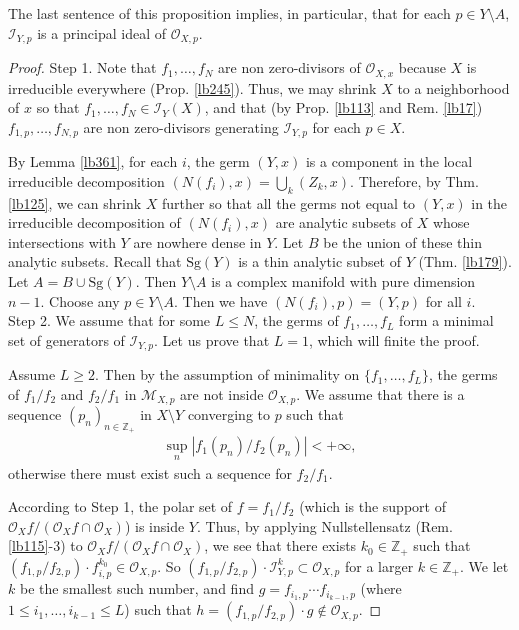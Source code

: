 \documentclass[12pt,b5paper,notitlepage]{report}
\theoremstyle{definition}
\theoremstyle{plain}
\newcommand{\scr}{\mathscr}
\newcommand{\Zbb}{\mathbb Z}
\newcommand{\Sg}{\mathrm{Sg}}
\numberwithin{equation}{section}
\begin{document}
The last sentence of this proposition implies, in particular, that for each $p\in Y\setminus A$, $\scr I_{Y,p}$ is a principal ideal of $\scr O_{X,p}$.


\begin{proof}
Step 1. Note that $f_1,\dots,f_N$ are non zero-divisors of $\scr O_{X,x}$ because $X$ is irreducible everywhere (Prop. \ref{lb245}). Thus, we may shrink $X$ to a neighborhood of $x$ so that $f_1,\dots,f_N\in\scr I_Y(X)$, and that (by Prop. \ref{lb113} and Rem. \ref{lb17}) $f_{1,p},\dots,f_{N,p}$ are non zero-divisors generating $\scr I_{Y,p}$ for each $p\in X$.

By Lemma \ref{lb361}, for each $i$, the germ $(Y,x)$ is a component in the local irreducible decomposition $(N(f_i),x)=\bigcup_k (Z_k,x)$. Therefore, by Thm. \ref{lb125}, we can shrink $X$ further so that all the germs not equal to $(Y,x)$ in the irreducible decomposition of $(N(f_i),x)$  are analytic subsets of $X$ whose intersections with $Y$ are nowhere dense in $Y$. Let $B$ be the union of these thin analytic subsets. Recall that $\Sg(Y)$ is a thin analytic subset of $Y$ (Thm. \ref{lb179}). Let $A=B\cup\Sg(Y)$. Then $Y\setminus A$ is a complex manifold with pure dimension $n-1$. Choose any $p\in Y\setminus A$. Then we have $(N(f_i),p)=(Y,p)$ for all $i$.\\


Step 2. We assume that for some $L\leq N$, the germs of $f_1,\dots,f_L$ form a minimal set of generators of $\scr I_{Y,p}$. Let us prove that $L=1$, which will finite the proof.

Assume $L\geq 2$. Then by the assumption of minimality on $\{f_1,\dots,f_L\}$, the germs of $f_1/f_2$ and $f_2/f_1$ in $\scr M_{X,p}$ are not inside $\scr O_{X,p}$. We assume that there is a sequence $(p_n)_{n\in\Zbb_+}$ in $X\setminus Y$ converging to $p$ such that
\begin{align}
\sup_n|f_1(p_n)/f_2(p_n)|<+\infty,  \label{eq96}
\end{align}
otherwise there must exist such a sequence for $f_2/f_1$.

According to Step 1, the polar set of $f=f_1/f_2$ (which is the support of $\scr O_Xf/(\scr O_X f\cap \scr O_X)$) is inside $Y$. Thus, by applying Nullstellensatz (Rem. \ref{lb115}-3) to $\scr O_Xf/(\scr O_Xf\cap\scr O_X)$, we see that there exists $k_0\in\Zbb_+$ such that $(f_{1,p}/f_{2,p})\cdot f_{i,p}^{k_0}\in\scr O_{X,p}$. So $(f_{1,p}/f_{2,p})\cdot\scr I_{Y,p}^k\subset\scr O_{X,p}$ for a larger $k\in\Zbb_+$. We let $k$ be the smallest such number, and find $g=f_{i_1,p}\cdots f_{i_{k-1},p}$ (where $1\leq i_1,\dots,i_{k-1}\leq L$) such that $h=(f_{1,p}/f_{2,p})\cdot g\notin\scr O_{X,p}$. 


\end{proof}
\end{document}
